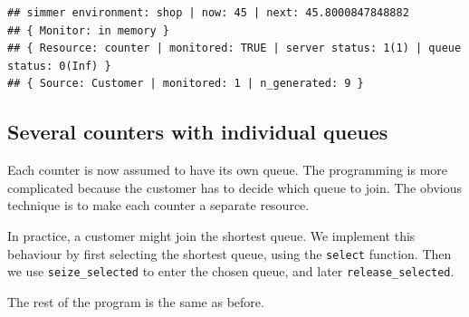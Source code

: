 \documentclass[
]{book}
\begin{document}
\begin{verbatim}
## simmer environment: shop | now: 45 | next: 45.8000847848882
## { Monitor: in memory }
## { Resource: counter | monitored: TRUE | server status: 1(1) | queue status: 0(Inf) }
## { Source: Customer | monitored: 1 | n_generated: 9 }
\end{verbatim}

\hypertarget{several-counters-with-individual-queues}{%
\subsection{Several counters with individual queues}\label{several-counters-with-individual-queues}}

Each counter is now assumed to have its own queue. The programming is more complicated because the customer has to decide which queue to join. The obvious technique is to make each counter a separate resource.

In practice, a customer might join the shortest queue. We implement this behaviour by first selecting the shortest queue, using the \texttt{select} function. Then we use \texttt{seize\_selected} to enter the chosen queue, and later \texttt{release\_selected}.

The rest of the program is the same as before.
\end{document}
